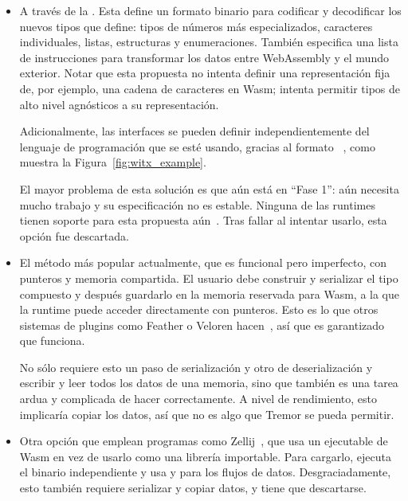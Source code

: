 \begin{itemize}
    \item A través de la \textcite{wasminterfacetypes}. Esta define un formato
        binario para codificar y decodificar los nuevos tipos que define: tipos
        de números más especializados, caracteres individuales, listas,
        estructuras y enumeraciones. También especifica una lista de
        instrucciones para transformar los datos entre WebAssembly y el mundo
        exterior. Notar que esta propuesta no intenta definir una representación
        fija de, por ejemplo, una cadena de caracteres en Wasm; intenta permitir
        tipos de alto nivel agnósticos a su representación.

        Adicionalmente, las interfaces se pueden definir independientemente del
        lenguaje de programación que se esté usando, gracias al formato
        ~\cite{witx}, como muestra la Figura~\ref{fig:witx_example}.

        El mayor problema de esta solución es que aún está en ``Fase 1'': aún
        necesita mucho trabajo y su especificación no es estable. Ninguna de las
        runtimes tienen soporte para esta propuesta
        aún~\cite{interfacetypeswasmtime}\cite{interfacetypeswasmer}. Tras
        fallar al intentar usarlo, esta opción fue descartada.

    \item El método más popular actualmente, que es funcional pero imperfecto,
        con punteros y memoria compartida. El usuario debe construir y
        serializar el tipo compuesto y después guardarlo en la memoria reservada
        para Wasm, a la que la runtime puede acceder directamente con punteros.
        Esto es lo que otros sistemas de plugins como Feather o Veloren
        hacen~\cite{featherpluginsystem}\cite{velorenpluginsystem}, así que es
        garantizado que funciona.

        No sólo requiere esto un paso de serialización y otro de deserialización
        y escribir y leer todos los datos de una memoria, sino que también es
        una tarea ardua y complicada de hacer correctamente. A nivel de
        rendimiento, esto implicaría copiar los datos, así que no es algo que
        Tremor se pueda permitir.

    \item Otra opción que emplean programas como
        Zellij~\cite{zellijpluginsystem}, que usa un ejecutable de Wasm en vez
        de usarlo como una librería importable. Para cargarlo, ejecuta el
        binario independiente y usa \stdin y \stdout para los flujos de datos.
        Desgraciadamente, esto también requiere serializar y copiar datos, y
        tiene que descartarse.

\end{itemize}

